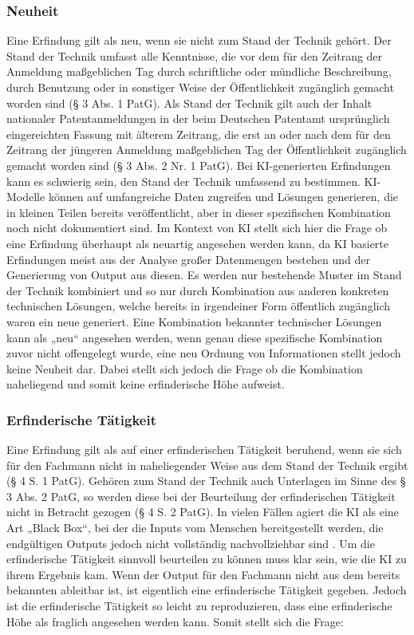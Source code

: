 \subsubsection{Neuheit}
Eine Erfindung gilt als neu, wenn sie nicht zum Stand der Technik gehört. 
Der Stand der Technik umfasst alle Kenntnisse, 
die vor dem für den Zeitrang der Anmeldung
maßgeblichen Tag durch schriftliche 
oder mündliche Beschreibung, durch Benutzung oder in
sonstiger Weise der Öffentlichkeit zugänglich gemacht worden sind (§ 3 Abs. 1 PatG).
Als Stand der Technik gilt auch der Inhalt nationaler Patentanmeldungen 
in der beim Deutschen
Patentamt ursprünglich eingereichten Fassung mit älterem Zeitrang, 
die erst an oder nach dem für
den Zeitrang der jüngeren Anmeldung maßgeblichen Tag der Öffentlichkeit 
zugänglich gemacht
worden sind (§ 3 Abs. 2 Nr. 1 PatG). 
Bei KI-generierten Erfindungen kann es schwierig sein, 
den Stand der Technik umfassend zu bestimmen. 
KI-Modelle können auf umfangreiche Daten zugreifen und Lösungen generieren, 
die in kleinen Teilen bereits veröffentlicht, 
aber in dieser spezifischen Kombination noch nicht dokumentiert sind.
Im Kontext von KI stellt sich hier die Frage 
ob eine Erfindung überhaupt als neuartig angesehen werden kann, 
da KI basierte Erfindungen meist aus der Analyse großer Datenmengen bestehen
und der Generierung von Output aus diesen. 
Es werden nur bestehende Muster im Stand der Technik kombiniert 
und so nur durch Kombination aus anderen konkreten technischen Lösungen, 
welche bereits in irgendeiner Form öffentlich zugänglich waren ein neue generiert.
Eine Kombination bekannter technischer Lösungen kann als „neu“ angesehen werden,
wenn genau diese spezifische Kombination zuvor nicht offengelegt wurde, 
eine neu Ordnung von Informationen stellt jedoch keine Neuheit dar.
Dabei stellt sich jedoch die Frage ob die Kombination naheliegend und
somit keine erfinderische Höhe aufweist.

\subsubsection{Erfinderische Tätigkeit}
Eine Erfindung gilt als auf einer erfinderischen Tätigkeit beruhend, 
wenn sie sich für den Fachmann
nicht in naheliegender Weise aus dem Stand der Technik ergibt (§ 4 S. 1 PatG). 
Gehören zum Stand
der Technik auch Unterlagen im Sinne des § 3 Abs. 2 PatG, 
so werden diese bei der Beurteilung der
erfinderischen Tätigkeit nicht in Betracht gezogen (§ 4 S. 2 PatG).
In vielen Fällen agiert die KI als eine Art „Black Box“, 
bei der die Inputs vom Menschen bereitgestellt werden, 
die endgültigen Outputs jedoch nicht vollständig nachvollziehbar sind 
\cite{pauliniKIgenerierteErfindungPatentrechtliche}. 
Um die erfinderische Tätigkeit sinnvoll beurteilen zu können
muss klar sein, wie die KI zu ihrem Ergebnis kam. 
Wenn der Output für den Fachmann nicht aus dem bereits bekannten 
ableitbar ist, ist eigentlich eine erfinderische Tätigkeit gegeben.
Jedoch ist die erfinderische Tätigkeit so leicht zu reproduzieren,
dass eine erfinderische Höhe als fraglich angesehen werden kann.
Somit stellt sich die Frage: 

